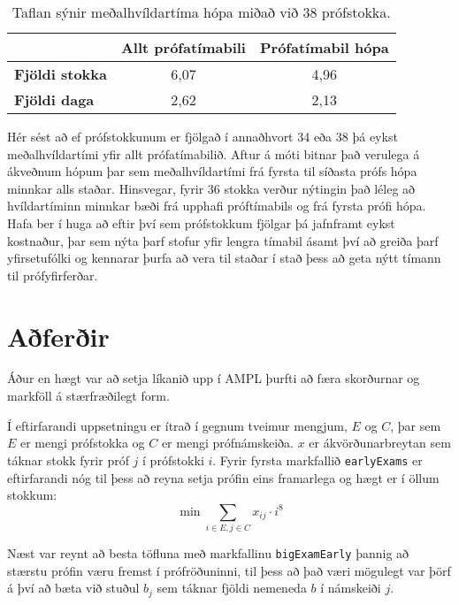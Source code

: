 \documentclass[12pt]{article}
\begin{document}
\begin{table}[h]
    \centering
    \begin{tabular}{l|c|c|}
        \cline{2-3}
        & \multicolumn{1}{l|}{\textbf{Allt prófatímabili}} & \multicolumn{1}{l|}{\textbf{Prófatímabil hópa}} \\ \hline
        \multicolumn{1}{|l|}{\textbf{Fjöldi stokka}} & 6,07                                             & 4,96                                            \\ \hline
        \multicolumn{1}{|l|}{\textbf{Fjöldi daga}}   & 2,62                                             & 2,13                                            \\ \hline
    \end{tabular}
    \caption{Taflan sýnir meðalhvíldartíma hópa miðað við 38 prófstokka.}
\end{table}


Hér sést að ef prófstokkunum er fjölgað í annaðhvort 34 eða 38 þá eykst meðalhvíldartími yfir allt prófatímabilið. Aftur á móti bitnar það verulega á ákveðnum hópum þar sem meðalhvíldartími frá fyrsta til síðasta prófs hópa minnkar alls staðar. Hinsvegar, fyrir 36 stokka verður nýtingin það léleg að hvíldartíminn minnkar bæði frá upphafi próftímabils og frá fyrsta prófi hópa. Hafa ber í huga að eftir því sem prófstokkum fjölgar þá jafnframt eykst kostnaður, þar sem nýta þarf stofur yfir lengra tímabil ásamt því að greiða þarf yfirsetufólki og kennarar þurfa að vera til staðar í stað þess að geta nýtt tímann til prófyfirferðar.
\newpage

\section{Aðferðir}

Áður en hægt var að setja líkanið upp í AMPL þurfti að færa skorðurnar og markföll á stærfræðilegt form. 


\medskip
Í eftirfarandi uppsetningu er ítrað í gegnum tveimur mengjum, $ E $ og $ C $, þar sem $ E $ er mengi prófstokka og $ C $ er mengi prófnámskeiða. $ x $ er ákvörðunarbreytan sem táknar stokk fyrir próf $ j $ í prófstokki $ i $. Fyrir fyrsta markfallið \texttt{earlyExams} er eftirfarandi nóg til þess að reyna setja prófin eins framarlega og hægt er í öllum stokkum:
$$\min \sum_{i \in E,j \in C } x_{ij} \cdot i^8$$

Næst var reynt að besta töfluna með markfallinu \texttt{bigExamEarly} þannig að stærstu prófin væru fremst í prófröðuninni, til þess að það væri mögulegt var þörf á því að bæta við stuðul $b_{j}$ sem táknar fjöldi nemeneda $ b $ í námskeiði $ j $.
\end{document}

